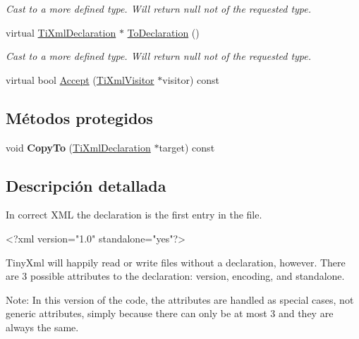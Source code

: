 \begin{DoxyCompactItemize}
\begin{DoxyCompactList}\small\item\em \-Cast to a more defined type. \-Will return null not of the requested type. \end{DoxyCompactList}\item 
\hypertarget{classTiXmlDeclaration_a6bd3d1daddcaeb9543c24bfd090969ce}{virtual \hyperlink{classTiXmlDeclaration}{\-Ti\-Xml\-Declaration} $\ast$ \hyperlink{classTiXmlDeclaration_a6bd3d1daddcaeb9543c24bfd090969ce}{\-To\-Declaration} ()}\label{classTiXmlDeclaration_a6bd3d1daddcaeb9543c24bfd090969ce}

\begin{DoxyCompactList}\small\item\em \-Cast to a more defined type. \-Will return null not of the requested type. \end{DoxyCompactList}\item 
virtual bool \hyperlink{classTiXmlDeclaration_ab6a6b178161ba9abc2c35058de689864}{\-Accept} (\hyperlink{classTiXmlVisitor}{\-Ti\-Xml\-Visitor} $\ast$visitor) const 
\end{DoxyCompactItemize}
\subsection*{\-Métodos protegidos}
\begin{DoxyCompactItemize}
\item 
\hypertarget{classTiXmlDeclaration_a9d08959f935421a593032bd3efb30c38}{void {\bfseries \-Copy\-To} (\hyperlink{classTiXmlDeclaration}{\-Ti\-Xml\-Declaration} $\ast$target) const }\label{classTiXmlDeclaration_a9d08959f935421a593032bd3efb30c38}

\end{DoxyCompactItemize}


\subsection{\-Descripción detallada}
\-In correct \-X\-M\-L the declaration is the first entry in the file. \begin{DoxyVerb}
		<?xml version="1.0" standalone="yes"?>
	\end{DoxyVerb}


\-Tiny\-Xml will happily read or write files without a declaration, however. \-There are 3 possible attributes to the declaration\-: version, encoding, and standalone.

\-Note\-: \-In this version of the code, the attributes are handled as special cases, not generic attributes, simply because there can only be at most 3 and they are always the same. 

